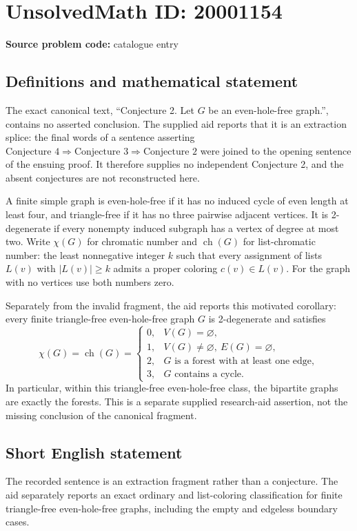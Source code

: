 \documentclass[11pt]{article}
\begin{document}
\section*{UnsolvedMath ID: 20001154}
\textbf{Source problem code:} catalogue entry
\subsection{Definitions and mathematical statement}
The exact canonical text, ``Conjecture 2. Let \(G\) be an even-hole-free graph.'', contains no asserted conclusion. The supplied aid reports that it is an extraction splice: the final words of a sentence asserting \(\text{Conjecture 4}\Rightarrow\text{Conjecture 3}\Rightarrow\text{Conjecture 2}\) were joined to the opening sentence of the ensuing proof. It therefore supplies no independent Conjecture 2, and the absent conjectures are not reconstructed here.

A finite simple graph is even-hole-free if it has no induced cycle of even length at least four, and triangle-free if it has no three pairwise adjacent vertices. It is 2-degenerate if every nonempty induced subgraph has a vertex of degree at most two. Write \(\chi(G)\) for chromatic number and \(\operatorname{ch}(G)\) for list-chromatic number: the least nonnegative integer \(k\) such that every assignment of lists \(L(v)\) with \(|L(v)|\geq k\) admits a proper coloring \(c(v)\in L(v)\). For the graph with no vertices use both numbers zero.

Separately from the invalid fragment, the aid reports this motivated corollary: every finite triangle-free even-hole-free graph \(G\) is 2-degenerate and satisfies
\[
 \chi(G)=\operatorname{ch}(G)=
 \begin{cases}
 0,&V(G)=\varnothing,\\
 1,&V(G)\ne\varnothing,\ E(G)=\varnothing,\\
 2,&G\text{ is a forest with at least one edge},\\
 3,&G\text{ contains a cycle}.
 \end{cases}
\]
In particular, within this triangle-free even-hole-free class, the bipartite graphs are exactly the forests. This is a separate supplied research-aid assertion, not the missing conclusion of the canonical fragment.
\subsection{Short English statement}
The recorded sentence is an extraction fragment rather than a conjecture. The aid separately reports an exact ordinary and list-coloring classification for finite triangle-free even-hole-free graphs, including the empty and edgeless boundary cases.
\end{document}
